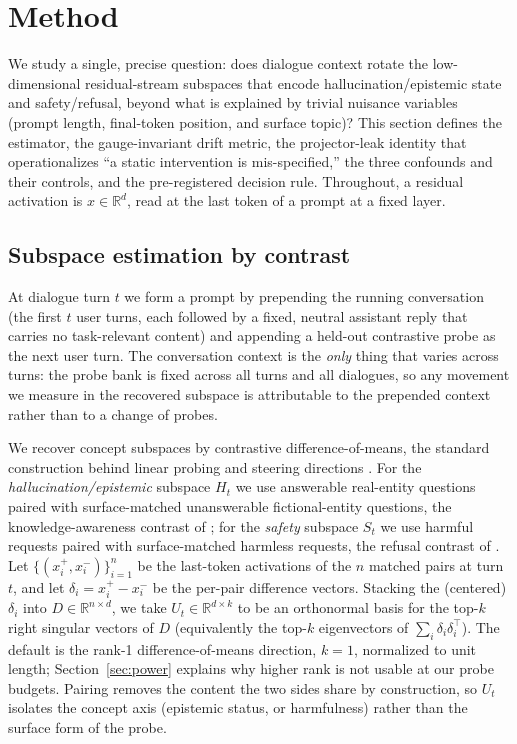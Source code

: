 \section{Method}
\label{sec:method}

We study a single, precise question: does dialogue context rotate the low-dimensional
residual-stream subspaces that encode hallucination/epistemic state and safety/refusal,
beyond what is explained by trivial nuisance variables (prompt length, final-token
position, and surface topic)? This section defines the estimator, the gauge-invariant
drift metric, the projector-leak identity that operationalizes ``a static intervention is
mis-specified,'' the three confounds and their controls, and the pre-registered decision
rule. Throughout, a residual activation is $x \in \mathbb{R}^d$, read at the last token of
a prompt at a fixed layer.

\subsection{Subspace estimation by contrast}
\label{sec:subspace}

At dialogue turn $t$ we form a prompt by prepending the running conversation (the first
$t$ user turns, each followed by a fixed, neutral assistant reply that carries no
task-relevant content) and appending a held-out contrastive probe as the next user turn.
The conversation context is the \emph{only} thing that varies across turns: the probe bank
is fixed across all turns and all dialogues, so any movement we measure in the recovered
subspace is attributable to the prepended context rather than to a change of probes.

We recover concept subspaces by contrastive difference-of-means, the standard construction
behind linear probing and steering directions
\citep{marks2023geometry, arditi2024refusal, panickssery2024caa}. For the
\emph{hallucination/epistemic} subspace $H_t$ we use answerable real-entity questions
paired with surface-matched unanswerable fictional-entity questions, the
knowledge-awareness contrast of \citet{ferrando2025entity}; for the \emph{safety} subspace
$S_t$ we use harmful requests paired with surface-matched harmless requests, the refusal
contrast of \citet{arditi2024refusal}. Let $\{(x_i^{+}, x_i^{-})\}_{i=1}^{n}$ be the
last-token activations of the $n$ matched pairs at turn $t$, and let
$\delta_i = x_i^{+} - x_i^{-}$ be the per-pair difference vectors. Stacking the (centered)
$\delta_i$ into $D \in \mathbb{R}^{n \times d}$, we take $U_t \in \mathbb{R}^{d \times k}$
to be an orthonormal basis for the top-$k$ right singular vectors of $D$ (equivalently the
top-$k$ eigenvectors of $\sum_i \delta_i \delta_i^\top$). The default is the rank-1
difference-of-means direction, $k=1$, normalized to unit length;
Section~\ref{sec:power} explains why higher rank is not usable at our probe budgets. Pairing
removes the content the two sides share by construction, so $U_t$ isolates the concept axis
(epistemic status, or harmfulness) rather than the surface form of the probe.

